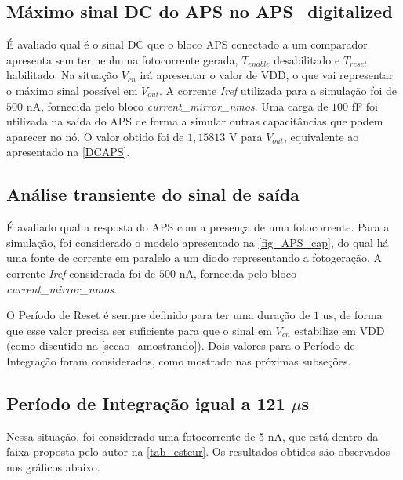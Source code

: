 \subsection{Máximo sinal DC do APS no APS\_digitalized}

É avaliado qual é o sinal DC que o bloco APS conectado a um comparador apresenta sem ter nenhuma fotocorrente gerada, $T_{enable}$ desabilitado e $T_{reset}$ habilitado. Na situação $V_{cn}$ irá apresentar o valor de VDD, o que vai representar o máximo sinal possível em $V_{out}$. A corrente \textit{Iref} utilizada para a simulação foi de $500$ nA, fornecida pelo bloco \textit{current\_mirror\_nmos}. Uma carga de $100$ fF foi utilizada na saída do APS de forma a simular outras capacitâncias que podem aparecer no nó. O valor obtido foi de $1,15813$ V para $V_{out}$, equivalente ao apresentado na \autoref{DCAPS}.

\subsection{Análise transiente do sinal de saída}

É avaliado qual a resposta do APS com a presença de uma fotocorrente. Para a simulação, foi considerado o modelo apresentado na \autoref{fig_APS_cap}, do qual há uma fonte de corrente em paralelo a um diodo representando a fotogeração. A corrente \textit{Iref} considerada foi de $500$ nA, fornecida pelo bloco \textit{current\_mirror\_nmos}.

O Período de Reset é sempre definido para ter uma duração de $1$ us, de forma que esse valor precisa ser suficiente para que o sinal em $V_{cn}$ estabilize em VDD (como discutido na \autoref{secao_amostrando}). Dois valores para o Período de Integração foram considerados, como mostrado nas próximas subseções.

\subsection{Período de Integração igual a 121 $\mu$s}

Nessa situação, foi considerado uma fotocorrente de 5 nA, que está dentro da faixa proposta pelo autor na \autoref{tab_estcur}. Os resultados obtidos são observados nos gráficos abaixo.

